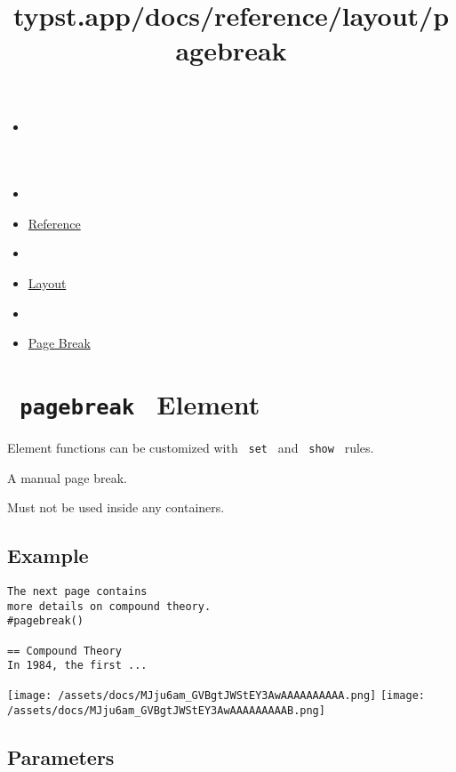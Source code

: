 \title{typst.app/docs/reference/layout/pagebreak}

\begin{itemize}
\tightlist
\item
  \href{/docs}{}
\item
  
\item
  \href{/docs/reference/}{Reference}
\item
  
\item
  \href{/docs/reference/layout/}{Layout}
\item
  
\item
  \href{/docs/reference/layout/pagebreak/}{Page Break}
\end{itemize}

\section{\texorpdfstring{\texttt{\ pagebreak\ } {{ Element
}}}{ pagebreak   Element }}\label{summary}

\label{element-tooltip}
Element functions can be customized with \texttt{\ set\ } and
\texttt{\ show\ } rules.

A manual page break.

Must not be used inside any containers.

\subsection{Example}\label{example}

\begin{verbatim}
The next page contains
more details on compound theory.
#pagebreak()

== Compound Theory
In 1984, the first ...
\end{verbatim}

\texttt{[image: /assets/docs/MJju6am\_GVBgtJWStEY3AwAAAAAAAAAA.png]}
\texttt{[image: /assets/docs/MJju6am\_GVBgtJWStEY3AwAAAAAAAAAB.png]}

\subsection{\texorpdfstring{{ Parameters
}}{ Parameters }}\label{parameters}

